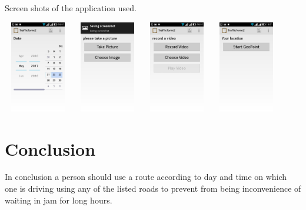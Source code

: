 \documentclass[options]{article}
\begin{document}
Screen shots of the application used.

\includegraphics[width =3cm,height=4cm]{1.png}
\includegraphics[width =3cm,height=4cm]{2.png}
\includegraphics[width =3cm,height=4cm]{3.png}
\includegraphics[width =3cm,height=4cm]{4.png}


\section{\textbf{Conclusion }} 
In conclusion a person should use a route according to day and time on which one is driving using any of the listed roads to prevent from being inconvenience of waiting in jam for long hours.
\end{document}

